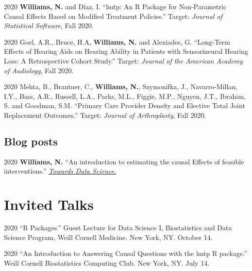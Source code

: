 \documentclass[12pt,letterpaper]{report}
\begin{document}
    \begin{tablist}
    
    \item[2020] \tab \textbf{Williams, N.} and Díaz, I. \enquote{lmtp: An R Package for Non-Parametric Causal Effects Based on Modified Treatment Policies.} Target: \textit{Journal of Statistical Software}, Fall 2020.
    
    \item[2020] \tab Goel, A.R., Bruce, H.A, \textbf{Williams, N.} and Alexiades, G. \enquote{Long-Term Effects of Hearing Aids on Hearing Ability in Patients with Sensorineural Hearing Loss: A Retrospective Cohort Study.} Target: \textit{Journal of the American Academy of Audiology}, Fall 2020.
    
    \item[2020] \tab Mehta, B., Brantner, C., \textbf{Williams, N.}, Szymonifka, J., Navarro-Millan, I.Y., Bass, A.R., Russell, L.A., Parks, M.L., Figgie, M.P., Nguyen, J.T., Ibrahim, S. and Goodman, S.M. \enquote{Primary Care Provider Density and Elective Total Joint Replacement Outcomes.} Target: \textit{Journal of Arthroplasty}, Fall 2020.
    
    \end{tablist}
    
    \subsection*{Blog posts}
    
    \begin{tablist}
    
    	\item[2020] \tab \textbf{Williams, N.} \enquote{An introduction to estimating the causal Effects of feasible interventions.} \href{https://towardsdatascience.com/an-introduction-to-estimating-the-causal-effects-of-feasible-interventions-e07ed45136ff?source=friends_link&sk=811ae7c0e029cd850418678a6284a781}{\textit{Towards Data Science}.}
    
    \end{tablist}

    \section*{Invited Talks}

    \begin{tablist}
    
    	\item[2020] \tab \enquote{R Packages.} Guest Lecture for Data Science I, Biostatistics and Data Science Program, Weill Cornell Medicine. New York, NY. October 14.

        \item[2020] \tab \enquote{An Introduction to Answering Causal Questions with the lmtp R package.} Weill Cornell Biostatistics Computing Club. New York, NY. July 14.

    \end{tablist}
    
\end{document}
